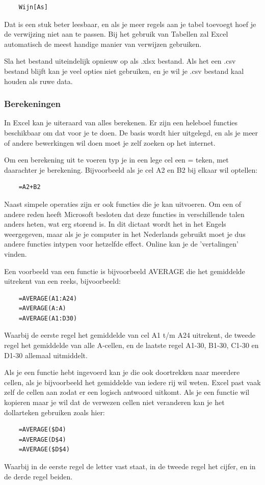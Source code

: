 \begin{verbatim}
    Wijn[As]
\end{verbatim}

Dat is een stuk beter leesbaar, en als je meer regels aan je tabel toevoegt hoef je de verwijzing niet aan te passen. Bij het gebruik van Tabellen zal Excel automatisch de meest handige manier van verwijzen gebruiken.

Sla het bestand uiteindelijk opnieuw op als .xlsx bestand. Als het een .csv bestand blijft kan je veel opties niet gebruiken, en je wil je .csv bestand kaal houden als ruwe data. 

\subsubsection*{Berekeningen}
In Excel kan je uiteraard van alles berekenen. Er zijn een heleboel functies beschikbaar om dat voor je te doen. De basis wordt hier uitgelegd, en als je meer of andere bewerkingen wil doen moet je zelf zoeken op het internet.

Om een berekening uit te voeren typ je in een lege cel een = teken, met daarachter je berekening. Bijvoorbeeld als je cel A2 en B2 bij elkaar wil optellen:

\begin{verbatim}
    =A2+B2
\end{verbatim}

Naast simpele operaties zijn er ook functies die je kan uitvoeren. Om een of andere reden heeft Microsoft besloten dat deze functies in verschillende talen anders heten, wat erg storend is. In dit dictaat wordt het in het Engels weergegeven, maar als je je computer in het Nederlands gebruikt moet je dus andere functies intypen voor hetzelfde effect. Online kan je de 'vertalingen' vinden. 

Een voorbeeld van een functie is bijvoorbeeld AVERAGE die het gemiddelde uitrekent van een reeks, bijvoorbeeld:
\begin{verbatim}
    =AVERAGE(A1:A24)
    =AVERAGE(A:A)
    =AVERAGE(A1:D30)
\end{verbatim}
Waarbij de eerste regel het gemiddelde van cel A1 t/m A24 uitrekent, de tweede regel het gemiddelde van alle A-cellen, en de laatste regel A1-30, B1-30, C1-30 en D1-30 allemaal uitmiddelt. 

Als je een functie hebt ingevoerd kan je die ook doortrekken naar meerdere cellen, als je bijvoorbeeld het gemiddelde van iedere rij wil weten. Excel past vaak zelf de cellen aan zodat er een logisch antwoord uitkomt. Als je een functie wil kopieren maar je wil dat de verwezen cellen niet veranderen kan je het dollarteken gebruiken zoals hier:
\begin{verbatim}
    =AVERAGE($D4)
    =AVERAGE(D$4)
    =AVERAGE($D$4)
\end{verbatim}
Waarbij in de eerste regel de letter vast staat, in de tweede regel het cijfer, en in de derde regel beiden.

